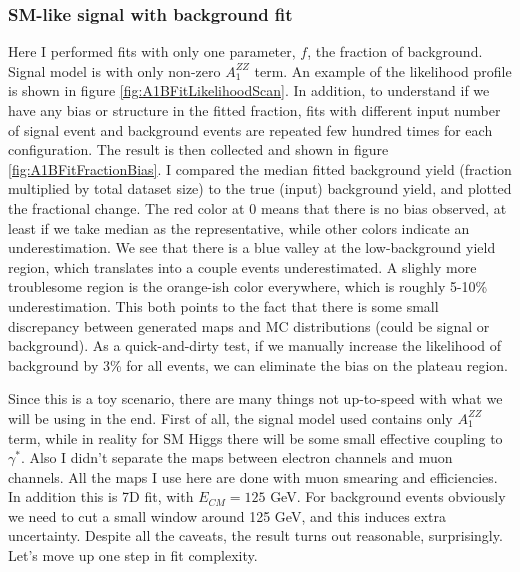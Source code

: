\documentclass{cmspaper}
\begin{document}
\subsubsection{SM-like signal with background fit}

Here I performed fits with only one parameter, $f$, the fraction of background.
Signal model is with only non-zero $A_1^{ZZ}$ term.  An example of the likelihood
profile is shown in figure \ref{fig:A1BFitLikelihoodScan}.  In addition,
to understand if we have any bias or structure in the fitted fraction, fits with
different input number of signal event and background events are repeated few hundred
times for each configuration.  The result is then collected and shown in figure
\ref{fig:A1BFitFractionBias}.  I compared the median fitted background yield (fraction
multiplied by total dataset size) to the true (input) background yield, and plotted
the fractional change.  The red color at 0 means that there is no bias observed,
at least if we take median as the representative, while other colors indicate an
underestimation.  We see that there is a blue valley at the low-background yield
region, which translates into a couple events underestimated.  A slighly more
troublesome region is the orange-ish color everywhere, which is roughly 5-10\%
underestimation.  This both points to the fact that there is some small discrepancy
between generated maps and MC distributions (could be signal or background).
As a quick-and-dirty test, if we manually increase the likelihood of background by
3\% for all events, we can eliminate the bias on the plateau region.

Since this is a toy scenario, there are many things not up-to-speed with what
we will be using in the end.  First of all, the signal model used contains only
$A_1^{ZZ}$ term, while in reality for SM Higgs there will be some small effective
coupling to $\gamma^*$.  Also I didn't separate the maps between electron channels
and muon channels.  All the maps I use here are done with muon smearing and efficiencies.
In addition this is 7D fit, with $E_{CM} = 125$ GeV.  For background events obviously
we need to cut a small window around 125 GeV, and this induces extra uncertainty.
Despite all the caveats, the result turns out reasonable, surprisingly.  Let's move
up one step in fit complexity.
\end{document}
